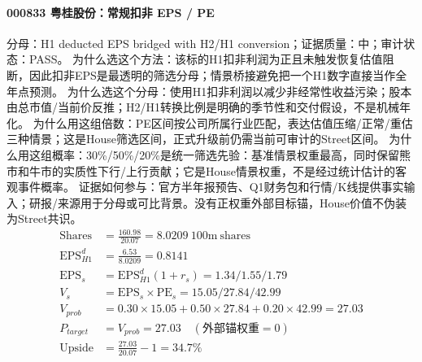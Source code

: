 \paragraph{000833 粤桂股份：常规扣非 EPS / PE}
分母：H1 deducted EPS bridged with H2/H1 conversion；证据质量：中；审计状态：PASS。
为什么选这个方法：该标的H1扣非利润为正且未触发恢复估值阻断，因此扣非EPS是最透明的筛选分母；情景桥接避免把一个H1数字直接当作全年点预测。
为什么选这个分母：使用H1扣非利润以减少非经常性收益污染；股本由总市值/当前价反推；H2/H1转换比例是明确的季节性和交付假设，不是机械年化。
为什么用这组倍数：PE区间按公司所属行业匹配，表达估值压缩/正常/重估三种情景；这是House筛选区间，正式升级前仍需当前可审计的Street区间。
为什么用这组概率：30\%/50\%/20\%是统一筛选先验：基准情景权重最高，同时保留熊市和牛市的实质性下行/上行贡献；它是House情景权重，不是经过统计估计的客观事件概率。
证据如何参与：官方半年报预告、Q1财务包和行情/K线提供事实输入；研报/来源用于分母或可比背景。没有正权重外部目标锚，House价值不伪装为Street共识。
\begin{align*}
\mathrm{Shares} &= \frac{160.98}{20.07}=8.0209\ \mathrm{100m\ shares}\\
\mathrm{EPS}_{H1}^d &= \frac{6.53}{8.0209}=0.8141\\
\mathrm{EPS}_s &= \mathrm{EPS}_{H1}^d(1+r_s)=1.34/1.55/1.79\\
V_s &= \mathrm{EPS}_s\times \mathrm{PE}_s=15.05/27.84/42.99\\
V_{prob} &= 0.30\times 15.05+0.50\times 27.84+0.20\times 42.99=27.03\\
P_{target} &= V_{prob}=27.03\quad(\text{外部锚权重}=0)\\
\mathrm{Upside} &= \frac{27.03}{20.07}-1=34.7\%\\
\end{align*}

